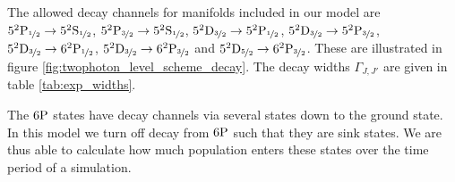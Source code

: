     The allowed decay channels for manifolds included in our model are
    $5^2\rm{P}_{\nicefrac{1}{2}} \rightarrow 5^2\rm{S}_{\nicefrac{1}{2}}$,
    $5^2\rm{P}_{\nicefrac{3}{2}} \rightarrow 5^2\rm{S}_{\nicefrac{1}{2}}$,
    $5^2\rm{D}_{\nicefrac{3}{2}} \rightarrow 5^2\rm{P}_{\nicefrac{1}{2}}$,
    $5^2\rm{D}_{\nicefrac{3}{2}} \rightarrow 5^2\rm{P}_{\nicefrac{3}{2}}$,
    $5^2\rm{D}_{\nicefrac{3}{2}} \rightarrow 6^2\rm{P}_{\nicefrac{1}{2}}$,
    $5^2\rm{D}_{\nicefrac{3}{2}} \rightarrow 6^2\rm{P}_{\nicefrac{3}{2}}$ and
    $5^2\rm{D}_{\nicefrac{5}{2}} \rightarrow 6^2\rm{P}_{\nicefrac{3}{2}}$. These
    are illustrated in figure \ref{fig:twophoton_level_scheme_decay}. The decay
    widths $\Gamma_{J,J'}$ are given in table \ref{tab:exp_widths}. 

    The $6\rm{P}$ states have decay channels via several states down to the
    ground state. In this model we turn off decay from $6\rm{P}$ such that they
    are sink states. We are thus able to calculate how much population enters
    these states over the time period of a simulation.

